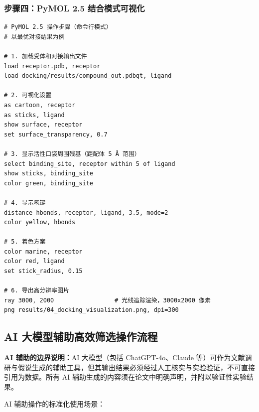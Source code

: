 \documentclass[12pt,a4paper,twoside]{article}
\begin{document}
\subsubsection{步骤四：PyMOL 2.5 结合模式可视化}

\begin{lstlisting}[language={},caption={PyMOL 结合模式可视化命令}]
# PyMOL 2.5 操作步骤（命令行模式）
# 以最优对接结果为例

# 1. 加载受体和对接输出文件
load receptor.pdb, receptor
load docking/results/compound_out.pdbqt, ligand

# 2. 可视化设置
as cartoon, receptor
as sticks, ligand
show surface, receptor
set surface_transparency, 0.7

# 3. 显示活性口袋周围残基（距配体 5 Å 范围）
select binding_site, receptor within 5 of ligand
show sticks, binding_site
color green, binding_site

# 4. 显示氢键
distance hbonds, receptor, ligand, 3.5, mode=2
color yellow, hbonds

# 5. 着色方案
color marine, receptor
color red, ligand
set stick_radius, 0.15

# 6. 导出高分辨率图片
ray 3000, 2000                 # 光线追踪渲染，3000x2000 像素
png results/04_docking_visualization.png, dpi=300
\end{lstlisting}

\subsection{AI 大模型辅助高效筛选操作流程}
\label{sec:module4_ai}

\begin{warningbox}
\textbf{AI 辅助的边界说明：}AI 大模型（包括 ChatGPT-4o、Claude 等）可作为文献调研与假说生成的辅助工具，但其输出结果必须经过人工核实与实验验证，不可直接引用为数据。所有 AI 辅助生成的内容须在论文中明确声明，并附以验证性实验结果。
\end{warningbox}

AI 辅助操作的标准化使用场景：
\end{document}
